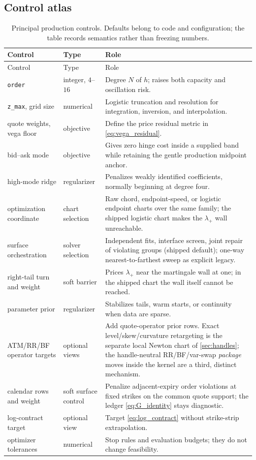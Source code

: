 \documentclass[11pt]{article}
\begin{document}
\subsection{Control atlas}

\begin{longtable}{@{}p{}p{}p{}@{}}
\caption{Principal production controls.  Defaults belong to code and
configuration; the table records semantics rather than freezing numbers.}
\label{tab:controls}\\
\toprule
Control & Type & Role\\
\midrule
\endfirsthead
\toprule
Control & Type & Role\\
\midrule
\endhead
\texttt{order}
& integer, $4$--$16$
& Degree $N$ of $h$; raises both capacity and oscillation risk.\\
\texttt{z\_max}, grid size
& numerical
& Logistic truncation and resolution for integration, inversion, and
  interpolation.\\
quote weights, vega floor
& objective
& Define the price residual metric in \eqref{eq:vega_residual}.\\
bid--ask mode
& objective
& Gives zero hinge cost inside a supplied band while retaining the gentle
  production midpoint anchor.\\
high-mode ridge
& regularizer
& Penalizes weakly identified coefficients, normally beginning at degree
  four.\\
optimization coordinate
& chart selection
& Raw chord, endpoint-speed, or logistic endpoint charts over the same
  family; the shipped logistic chart makes the $\lambda_+$ wall
  unreachable.\\
surface orchestration
& solver selection
& Independent fits, interface screen, joint repair of violating groups
  (shipped default); one-way nearest-to-farthest sweep as explicit
  legacy.\\
right-tail turn and weight
& soft barrier
& Prices $\lambda_+$ near the martingale wall at one; in the shipped chart
  the wall itself cannot be reached.\\
parameter prior
& regularizer
& Stabilizes tails, warm starts, or continuity when data are sparse.\\
ATM/RR/BF operator targets
& optional views
& Add quote-operator prior rows.  Exact level/skew/curvature retargeting is
  the separate local Newton chart of \cref{sec:handles}; the handle-neutral
  RR/BF/var-swap \emph{package} moves inside the kernel are a third,
  distinct mechanism.\\
calendar rows and weight
& soft surface control
& Penalize adjacent-expiry order violations at fixed strikes on the common
  quote support; the ledger \eqref{eq:G_identity} stays diagnostic.\\
log-contract target
& optional view
& Target \eqref{eq:log_contract} without strike-strip extrapolation.\\
optimizer tolerances
& numerical
& Stop rules and evaluation budgets; they do not change feasibility.\\
\bottomrule
\end{longtable}
\end{document}
